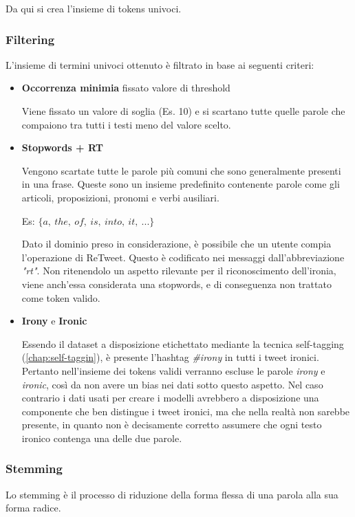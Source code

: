 \documentclass[oneside]{book}
\begin{document}
Da qui si crea l'insieme di tokens univoci.

\subsubsection{Filtering}
L'insieme di termini univoci ottenuto è filtrato in base ai seguenti criteri:
\begin{itemize}
	\item \textbf{Occorrenza minimia} fissato valore di threshold
		
		Viene fissato un valore di soglia (Es. 10) e si scartano tutte quelle parole che compaiono tra tutti i testi meno del valore scelto. 
	\item \textbf{Stopwords + RT}
	
		Vengono scartate tutte le parole più comuni che sono generalmente presenti in una frase. Queste sono un insieme predefinito contenente parole come gli articoli, proposizioni, pronomi e verbi ausiliari.
		
		Es: $\{a,\ the,\ of,\ is,\ into,\ it,\ ...\}$
		
		Dato il dominio preso in considerazione, è possibile che un utente compia l'operazione di ReTweet. Questo è codificato nei messaggi dall'abbreviazione \emph{"rt"}. Non ritenendolo un aspetto rilevante per il riconoscimento dell'ironia, viene anch'essa considerata una stopwords, e di conseguenza non trattato come token valido.
	
		
	\item \textbf{Irony} e \textbf{Ironic}
	
	Essendo il dataset a disposizione etichettato mediante la tecnica self-tagging (\autoref{chap:self-taggin}), è presente l'hashtag \emph{\#irony} in tutti i tweet ironici. Pertanto nell'insieme dei tokens validi verranno escluse le parole \emph{irony} e \emph{ironic}, così da non avere un bias nei dati sotto questo aspetto. Nel caso contrario i dati usati per creare i modelli avrebbero a disposizione una componente che ben distingue i tweet ironici, ma che nella realtà non sarebbe presente, in quanto non è decisamente corretto assumere che ogni testo ironico contenga una delle due parole.
	
	
\end{itemize}

\subsubsection{Stemming}
Lo stemming è il processo di riduzione della forma flessa di una parola alla sua forma radice.
\end{document}
